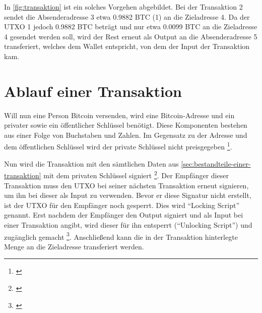 In \vref{fig:transaktion} ist ein solches Vorgehen abgebildet. Bei der Transaktion 2 sendet die Absenderadresse 3 etwa 0.9882 BTC (1) an die Zieladresse 4. Da der UTXO 1 jedoch 0.9882 BTC beträgt und nur etwa 0.0099 BTC an die Zieladresse 4 gesendet werden soll, wird der Rest erneut als Output an die Absenderadresse 5 transferiert, welches dem Wallet entspricht, von dem der Input der Transaktion kam.

\section{Ablauf einer Transaktion}\label{sec:ablauf-transaktion}
Will nun eine Person Bitcoin versenden, wird eine Bitcoin-Adresse und ein privater sowie ein öffentlicher Schlüssel benötigt. Diese Komponenten bestehen aus einer Folge von Buchstaben und Zahlen. Im Gegensatz zu der Adresse und dem öffentlichen Schlüssel wird der private Schlüssel nicht preisgegeben \footnote{\parencite[vgl.][]{BTCACADEMY.08.03.2021b}}.

Nun wird die Transaktion mit den sämtlichen Daten aus \cref{sec:bestandteile-einer-transaktion} mit dem privaten Schlüssel signiert \footnote{\parencite[vgl.][]{BTCACADEMY.08.03.2021b}}. Der Empfänger dieser Transaktion muss den UTXO bei seiner nächsten Transaktion erneut signieren, um ihn bei dieser als Input zu verwenden. Bevor er diese Signatur nicht erstellt, ist der UTXO für den Empfänger noch gesperrt. Dies wird ``Locking Script'' genannt. Erst nachdem der Empfänger den Output signiert und als Input bei einer Transaktion angibt, wird dieser für ihn entsperrt (``Unlocking Script'') und zugänglich gemacht \footnote{\parencite[vgl.][]{entwickler.de.NaN}}. Anschließend kann die in der Transaktion hinterlegte Menge an die Zieladresse transferiert werden.


